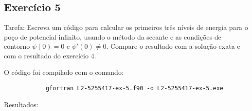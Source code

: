 \documentclass[12pt, a4paper]{article} %
\begin{document}
    \subsection{Exerc\'icio 5}

        Tarefa: Escreva um c\'odigo para calcular os primeiros tr\^es n\'iveis de energia para o po\c{c}o de potencial inﬁnito, usando o m\'etodo da secante e as condi\c{c}\~oes de contorno $\psi(0) = 0$ e
        $\psi '(0) \neq  0$. Compare o resultado com a solu\c{c}\~ao exata e com o resultado do exerc\'icio 4.


        O c\'odigo foi compilado com o comando:
        \begin{verbatim}
            gfortran L2-5255417-ex-5.f90 -o L2-5255417-ex-5.exe
        \end{verbatim}

        Resultados:
        
\end{document}

